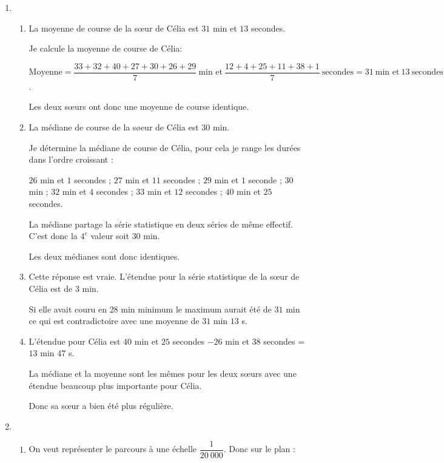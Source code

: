 \begin{enumerate}
    \item 
    \begin{enumerate}
        \item %
        La moyenne de course de la s\oe ur de Célia est $31$ min et $13$ secondes. 

        Je calcule la moyenne de course de Célia:

        $\text{Moyenne} = \dfrac{33+32+40+27+30+26+29}{7}~\text{min et}~\dfrac{12+4+25+11+38+1}{7}~\text{secondes}=31~\text{min et}~13~\text{secondes}$.

        Les deux s\oe urs ont donc une moyenne de course identique.


        \item La médiane de course de la s\o eur de Célia est $30$ min.
    
        Je détermine la médiane de course de Célia, pour cela je range les durées dans l’ordre croissant :

        $26$ min et $1$ secondes ; $27$ min et $11$ secondes ; $29$ min et $1$ seconde ; $30$ min ; $32$ min et $4$ secondes ; $33$ min et $12$ secondes ; $40$ min et $25$ secondes.

        La médiane partage la série statistique en deux séries de même effectif. C’est donc la $4^e$ valeur soit $30$ min.

        Les deux médianes sont donc identiques. 
        \item Cette réponse est vraie. L'étendue pour la série statistique de la s\oe ur de Célia est de $3$ min.
        
        Si elle avait couru en $28$ min minimum le maximum aurait été de $31$ min ce qui est contradictoire avec une moyenne de $31$ min $13$ s. 
        \item L'étendue pour Célia est $40$ min et $25$ secondes $- 26$ min et $38$ secondes = $13$ min $47$ s.
        
        La médiane et la moyenne sont les mêmes pour les deux s\oe urs avec une étendue beaucoup plus importante pour Célia.
        
        \medskip
        Donc sa s\oe ur a bien été plus régulière.
    \end{enumerate}
    \item   
    \begin{enumerate}
        \item On veut représenter le parcours à une échelle $\dfrac{1}{20~000}$. Donc sur le plan :
        

\end{enumerate}
\end{enumerate}
